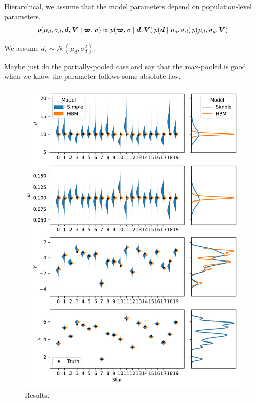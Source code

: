 Hierarchical, we assume that the model parameters depend on population-level parameters,
%
\begin{equation}
    p(\mu_d, \sigma_d, \bm{d}, \bm{V} \mid \bm{\varpi}, \bm{v}) \propto p(\bm{\varpi}, \bm{v} \mid \bm{d}, \bm{V}) \, p(\bm{d} \mid \mu_d, \sigma_d) \, p(\mu_d, \sigma_d, \bm{V})
\end{equation}
%

We assume \(d_i \sim \mathcal{N}(\mu_d, \sigma_d^2)\).

Maybe just do the partially-pooled case and say that the max-pooled is good when we know the parameter follows some absolute law.

\begin{figure}[p]
    \centering
    \includegraphics{figures/hbm-results.pdf}
    \caption{Results.}
\end{figure}